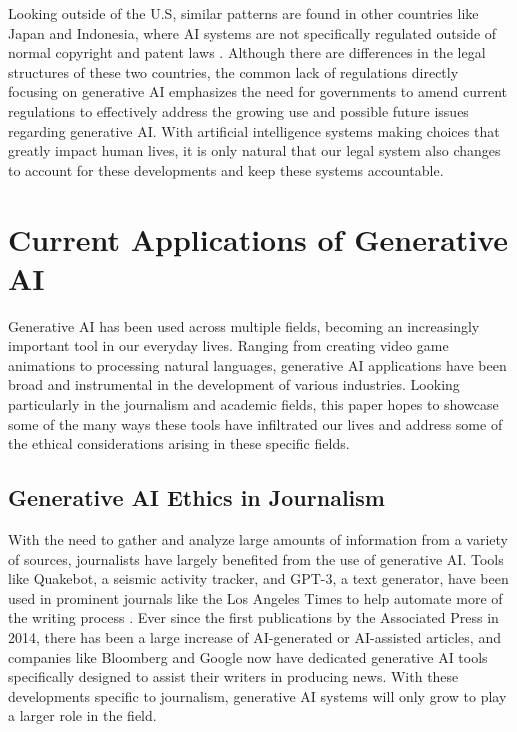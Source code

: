 \documentclass[manuscript,screen]{acmart}
\begin{document}
Looking outside of the U.S, similar patterns are found in other countries like Japan and Indonesia, where AI systems are not specifically regulated outside of normal copyright and patent laws \cite{PAPER:4}. Although there are differences in the legal structures of these two countries, the common lack of regulations directly focusing on generative AI emphasizes the need for governments to amend current regulations to effectively address the growing use and possible future issues regarding generative AI. With artificial intelligence systems making choices that greatly impact human lives, it is only natural that our legal system also changes to account for these developments and keep these systems accountable. 
\section{Current Applications of Generative AI}
Generative AI has been used across multiple fields, becoming an increasingly important tool in our everyday lives. Ranging from creating video game animations to processing natural languages, generative AI applications have been broad and instrumental in the development of various industries. Looking particularly in the journalism and academic fields, this paper hopes to showcase some of the many ways these tools have infiltrated our lives and address some of the ethical considerations arising in these specific fields. 

\subsection{Generative AI Ethics in Journalism}
With the need to gather and analyze large amounts of information from a variety of sources, journalists have largely benefited from the use of generative AI. Tools like Quakebot, a seismic activity tracker, and GPT-3, a text generator, have been used in prominent journals like the Los Angeles Times to help automate more of the writing process \cite{PAPER:3}. Ever since the first publications by the Associated Press in 2014, there has been a large increase of AI-generated or AI-assisted articles, and companies like Bloomberg and Google now have dedicated generative AI tools specifically designed to assist their writers in producing news. With these developments specific to journalism, generative AI systems will only grow to play a larger role in the field.
\end{document}

